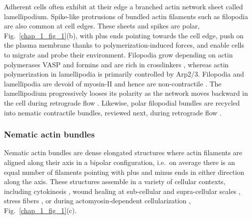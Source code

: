 Adherent cells often exhibit at their edge a branched actin network sheet called lamellipodium. Spike-like protrusions of bundled actin filaments such as filopodia are also common at cell edges. These sheets and spikes are polar, Fig.~\ref{chap_1_fig_1}(b), with  plus ends pointing towards the cell edge, push on the plasma membrane thanks to polymerization-induced forces, and enable cells to migrate and probe their environment. Filopodia grow depending on actin polymerases  VASP and formins \cite{svitkina2003} and are rich in crosslinkers \cite{bartles2000}, whereas actin polymerization in lamellipodia is primarily controlled by Arp2/3. Filopodia and lamellipodia are devoid of myosin-II and hence are non-contractile \cite{nemethova2008}. The lamellipodium progressively looses its polarity as the network moves backward in the cell during retrograde flow \cite{svitkina2020}. Likewise, polar filopodial bundles are recycled into nematic contractile bundles, reviewed next, during retrograde flow \cite{nemethova2008,doi:10.1091/mbc.e08-01-0034}.


\subsubsection{Nematic actin bundles}

Nematic actin bundles are dense elongated structures where actin filaments are aligned along their axis in a bipolar configuration, i.e.~on average there is an equal number of filaments pointing with plus and minus ends in either direction along the axis. These structures assemble in a variety of cellular contexts, including cytokinesis \cite{anne2016}, wound healing at sub-cellular 
\cite{mandato2001} and supra-cellular scales \cite{10.1242/jcs.109066}, stress fibers \cite{hotulainen2006}, or during actomyosin-dependent cellularization \cite{dudin2019}, Fig.~\ref{chap_1_fig_1}(c). 

